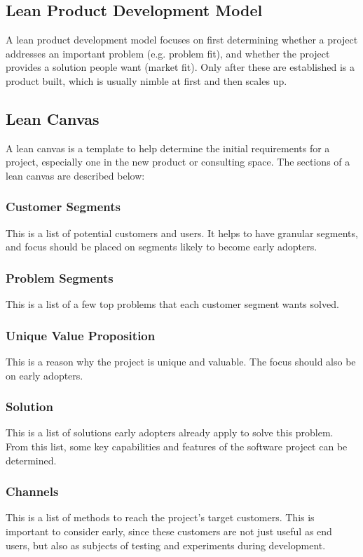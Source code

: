 \documentclass[12pt,titlepage]{article}
\begin{document}
    \subsection{Lean Product Development Model}
      A lean product development model focuses on first determining whether a project addresses an important problem (e.g. problem
      fit), and whether the project provides a solution people want (market fit). Only after these are established is a product built,
      which is usually nimble at first and then scales up.

    \subsection{Lean Canvas}
      A lean canvas is a template to help determine the initial requirements for a project, especially one in the new product or
      consulting space. The sections of a lean canvas are described below:

      \subsubsection{Customer Segments}
        This is a list of potential customers and users. It helps to have granular segments, and focus should be placed on segments likely
        to become early adopters.

      \subsubsection{Problem Segments}
        This is a list of a few top problems that each customer segment wants solved.

      \subsubsection{Unique Value Proposition}
        This is a reason why the project is unique and valuable. The focus should also be on early adopters.

      \subsubsection{Solution}
        This is a list of solutions early adopters already apply to solve this problem. From this list, some key capabilities and features
        of the software project can be determined.

      \subsubsection{Channels}
        This is a list of methods to reach the project's target customers. This is important to consider early, since these customers
        are not just useful as end users, but also as subjects of testing and experiments during development.
\end{document}
